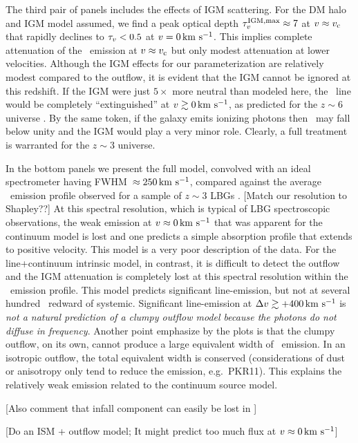\documentclass[12pt,preprint]{aastex}
\begin{document}
The third pair of panels includes the effects of IGM scattering.  For
the DM halo and IGM model assumed, we find a peak optical depth
$\tau_v^{\rm IGM, max} \approx 7$ at $v \approx v_{\rm c}$ that rapidly declines to
$\tau_v < 0.5$ at $v=0\, {\rm km~s^{-1}}$.  This implies complete attenuation of
the \lya\ emission at $v \approx v_{\rm c}$ but only modest
attenuation at lower velocities.  Although the IGM effects for our
parameterization are relatively modest compared to the outflow, it is evident that
the IGM cannot be ignored at this redshift.  If the IGM were just $5
\times$ more neutral than modeled here, the \lya\ line would be
completely ``extinguished'' at $v \gtrsim 0 \, {\rm km~s^{-1}}$, as predicted for
the $z \sim 6$ universe \citep{zheng+10a}.  By the same token, if the
galaxy emits ionizing photons then \tmax\ may fall below unity and the
IGM would play a very minor role.  Clearly, a full treatment 
is warranted for the $z \sim 3$ universe.

In the bottom panels we present the full model, convolved with an
ideal spectrometer having FWHM~$\approx 250\, {\rm km~s^{-1}}$, compared against the
average \lya\ emission profile observed for a sample of $z \sim 3$ 
LBGs \citep{shapley03}. 
[Match our resolution to Shapley??]
At this spectral resolution, which is
typical of LBG spectroscopic observations, the weak emission at $v
\approx 0 \, {\rm km~s^{-1}}$ that was
apparent for the continuum model is lost and one predicts a simple
absorption profile that extends to positive velocity. 
This model is a very poor description of the data.  
For the line+continuum intrinsic model, in contrast, it is difficult
to detect the outflow and the IGM attenuation is completely lost at
this spectral resolution within the \lya\ emission profile.
This model predicts significant line-emission, but not 
at several hundred \kms\ redward of systemic.  
Significant line-emission at $\Delta v \gtrsim +400 \, {\rm km~s^{-1}}$ is
{\it not a natural prediction of a clumpy outflow
  model because the photons do not diffuse in frequency}.
Another point emphasize by the plots is that the clumpy outflow, on
its own, cannot produce a large equivalent width of \lya\ emission.
In an isotropic outflow, the total equivalent width is conserved
(considerations of dust or anisotropy only tend to reduce the
emission, e.g.\ PKR11).  This explains the relatively weak emission
related to the continuum source model.  

[Also comment that infall component can easily be lost in \lya]

[Do an ISM + outflow model;  It might predict too much flux at $v
\approx 0 \, {\rm km~s^{-1}}$]
\end{document}
